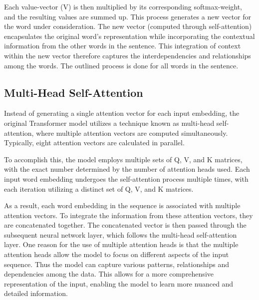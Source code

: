 \documentclass[a4paper,10pt]{report}
\begin{document}
Each value-vector (V) is then multiplied by its corresponding softmax-weight, and the resulting values are summed up. This process generates a new vector for the word under consideration. The new vector (computed through self-attention) encapsulates the original word's representation while incorporating the contextual information from the other words in the sentence. This integration of context within the new vector therefore captures the interdependencies and relationships among the words. The outlined process is done for all words in the sentence. \cite{VaswaniAttentionIsAll}

\subsection{Multi-Head Self-Attention}
Instead of generating a single attention vector for each input embedding, the original Transformer model utilizes a technique known as multi-head self-attention, where multiple attention vectors are computed simultaneously. Typically, eight attention vectors are calculated in parallel.

To accomplish this, the model employs multiple sets of Q, V, and K matrices, with the exact number determined by the number of attention heads used. Each input word embedding undergoes the self-attention process multiple times, with each iteration utilizing a distinct set of Q, V, and K matrices.

As a result, each word embedding in the sequence is associated with multiple attention vectors. To integrate the information from these attention vectors, they are concatenated together. The concatenated vector is then passed through the subsequent neural network layer, which follows the multi-head self-attention layer. 
One reason for the use of multiple attention heads is that the multiple attention heads allow the model to focus on different aspects of the input sequence. Thus the model can capture various patterns, relationships and dependencies among the data. This allows for a more comprehensive representation of the input, enabling the model to learn more nuanced and detailed information. \cite{VaswaniAttentionIsAll}
\end{document}
